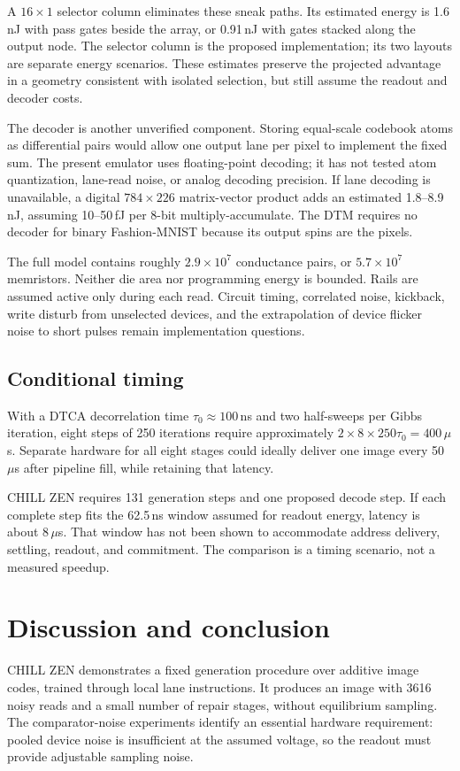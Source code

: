 \documentclass[reprint,amsmath,amssymb,aps,pra,floatfix,nofootinbib]{revtex4-2}
\begin{document}
A $16\times1$ selector column eliminates these sneak paths. Its estimated energy is 1.6\,nJ with pass gates beside the array, or 0.91\,nJ with gates stacked along the output node. The selector column is the proposed implementation; its two layouts are separate energy scenarios. These estimates preserve the projected advantage in a geometry consistent with isolated selection, but still assume the readout and decoder costs.

The decoder is another unverified component. Storing equal-scale codebook atoms as differential pairs would allow one output lane per pixel to implement the fixed sum. The present emulator uses floating-point decoding; it has not tested atom quantization, lane-read noise, or analog decoding precision. If lane decoding is unavailable, a digital $784\times226$ matrix-vector product adds an estimated 1.8--8.9\,nJ, assuming 10--50\,fJ per 8-bit multiply-accumulate. The DTM requires no decoder for binary Fashion-MNIST because its output spins are the pixels.

The full model contains roughly $2.9\times10^7$ conductance pairs, or $5.7\times10^7$ memristors. Neither die area nor programming energy is bounded. Rails are assumed active only during each read. Circuit timing, correlated noise, kickback, write disturb from unselected devices, and the extrapolation of device flicker noise to short pulses remain implementation questions.

\subsection{Conditional timing}
With a DTCA decorrelation time $\tau_0\approx100$\,ns and two half-sweeps per Gibbs iteration, eight steps of 250 iterations require approximately $2\times8\times250\tau_0=400\,\mu$s. Separate hardware for all eight stages could ideally deliver one image every 50\,$\mu$s after pipeline fill, while retaining that latency.

CHILL ZEN requires 131 generation steps and one proposed decode step. If each complete step fits the 62.5\,ns window assumed for readout energy, latency is about 8\,$\mu$s. That window has not been shown to accommodate address delivery, settling, readout, and commitment. The comparison is a timing scenario, not a measured speedup.

\section{Discussion and conclusion}
CHILL ZEN demonstrates a fixed generation procedure over additive image codes, trained through local lane instructions. It produces an image with 3616 noisy reads and a small number of repair stages, without equilibrium sampling. The comparator-noise experiments identify an essential hardware requirement: pooled device noise is insufficient at the assumed voltage, so the readout must provide adjustable sampling noise.
\end{document}
